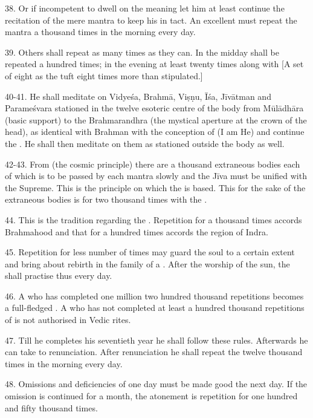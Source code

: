 38. Or if incompetent to dwell on the meaning let him at least continue
the recitation of the mere mantra to keep his  in tact.
An excellent  must repeat the mantra a thousand times in
the morning every day.

39. Others shall repeat as many times as they can. In the midday 
shall be repeated a hundred times; in the evening at least twenty times along
with  [A set of eight as the tuft \ie eight times more than
stipulated.]

40-41. He shall meditate on Vidyeśa, Brahmā, Viṣṇu, Īśa, Jīvātman and
Parameśvara stationed in the twelve esoteric centre of the body from Mūlādhāra
(basic support) to the Brahmarandhra (the mystical aperture at the crown of
the head), as identical with Brahman with the conception of  (I am He)
and continue the . He shall then meditate on them as stationed outside
the body as well.

42-43. From  (the cosmic principle) there are a thousand
extraneous bodies each of which is to be passed by each mantra slowly and
the Jīva must be unified with the Supreme. This is the principle on which
the  is based. This  for the sake of the extraneous bodies is
for two thousand times with the .

44. This is the tradition regarding the . Repetition for a thousand
times accords Brahmahood and that for a hundred times accords the region
of Indra.

45. Repetition for less number of times may guard the soul to a certain extent
and bring about rebirth in the family of a . After the worship of
the sun, the  shall practise thus every day.

46. A  who has completed one million two hundred thousand
repetitions becomes a full-fledged . A  who has not
completed at least a hundred thousand repetitions of  is not
authorised in Vedic rites.

47. Till he completes his seventieth year he shall follow these rules.
Afterwards he can take to renunciation. After renunciation he shall repeat
the  twelve thousand times in the morning every day.

48. Omissions and deficiencies of one day must be made good the next day. If
the omission is continued for a month, the atonement is repetition for one
hundred and fifty thousand times.

